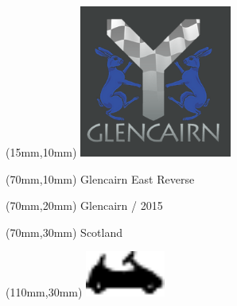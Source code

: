 \null\newpage
\begin{textblock*}{50mm}(15mm,10mm)%
\includegraphics[width=50mm]{LG/GLCN.png}
\end{textblock*}
\begin{textblock*}{130mm}(70mm,10mm)%
{\fontsize{20}{20}\selectfont Glencairn East Reverse}\\
\end{textblock*}
\begin{textblock*}{120mm}(70mm,20mm)%
{\fontsize{16}{16}\selectfont Glencairn / 2015}\\
\end{textblock*}
\begin{textblock*}{120mm}(70mm,30mm)%
{\fontsize{12}{12}\selectfont Scotland}
\end{textblock*}
\begin{textblock*}{30mm}(110mm,30mm)%
\centering
\includegraphics[height=15mm]{icons/kart.pdf}
\end{textblock*}
